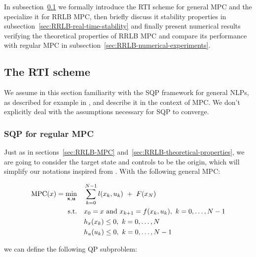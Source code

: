 \documentclass[12pt]{article}
\begin{document}
In subsection~\ref{sec:RTI-scheme} we formally introduce the RTI scheme for general MPC and the specialize it for RRLB MPC, then briefly discuss it stability properties in subsection~\ref{sec:RRLB-real-time-stability} and finally present numerical results verifying the theoretical properties of RRLB MPC and compare its performance with regular MPC in subsection~\ref{sec:RRLB-numerical-experiments}.

\subsection{The RTI scheme}\label{sec:RTI-scheme}

We assume in this section familiarity with the SQP framework for general NLPs, as described for example in \cite{nocedal-wright}, and describe it in the context of MPC.
We don't explicitly deal with the assumptions necessary for SQP to converge.

\subsubsection{SQP for regular MPC}

Just as in sections~\ref{sec:RRLB-MPC} and~\ref{sec:RRLB-theoretical-properties}, we are going to consider the target state and controls to be the origin, which will simplify our notations inspired from \cite{mpc-rti}.
With the following general MPC:

\begin{align*}
	\mathrm{MPC}(x)=\underset{\bf{x},\bf{u}}{\min} &\quad \sum_{k=0}^{N-1}l(x_k,u_k)~+~F(x_N)\\
	\text{s.t.} &\quad x_0=x\text{ and }x_{k+1}=f(x_k,u_k),~k=0,\ldots,N-1\\
	&\quad h_x(x_k)\leq 0,~k=0,\ldots,N\\
	&\quad h_u(u_k)\leq 0,~k=0,\ldots,N-1
\end{align*}

\noindent we can define the following QP subproblem:
\end{document}
